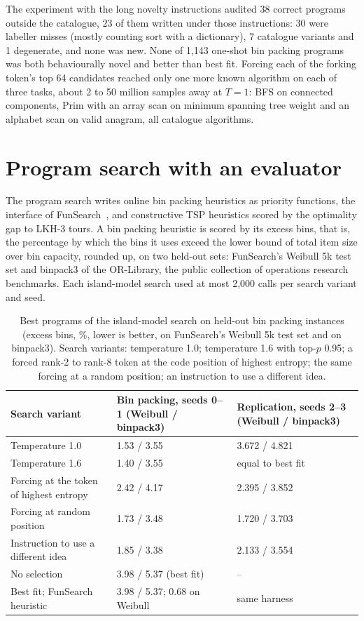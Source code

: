 \documentclass[11pt,letterpaper]{article}
\begin{document}
The experiment with the long novelty instructions audited 38 correct programs outside the catalogue, 23 of them written under those instructions: 30 were labeller misses (mostly counting sort with a dictionary), 7 catalogue variants and 1 degenerate, and none was new. None of 1,143 one-shot bin packing programs was both behaviourally novel and better than best fit. Forcing each of the forking token's top 64 candidates reached only one more known algorithm on each of three tasks, about 2 to 50 million samples away at $T = 1$: BFS on connected components, Prim with an array scan on minimum spanning tree weight and an alphabet scan on valid anagram, all catalogue algorithms.

\section{Program search with an evaluator}
\label{app:search}

The program search writes online bin packing heuristics as priority functions, the interface of FunSearch~\citep{RomeraParedes2023}, and constructive TSP heuristics scored by the optimality gap to LKH-3 tours. A bin packing heuristic is scored by its excess bins, that is, the percentage by which the bins it uses exceed the lower bound of total item size over bin capacity, rounded up, on two held-out sets: FunSearch's Weibull 5k test set and binpack3 of the OR-Library, the public collection of operations research benchmarks. Each island-model search used at most 2,000 calls per search variant and seed.

\begin{table}[!htbp]
\centering
\footnotesize
\caption{Best programs of the island-model search on held-out bin packing instances (excess bins, \%, lower is better, on FunSearch's Weibull 5k test set and on binpack3). Search variants: temperature 1.0; temperature 1.6 with top-$p$ 0.95; a forced rank-2 to rank-8 token at the code position of highest entropy; the same forcing at a random position; an instruction to use a different idea.}
\label{tab:search}
\begin{tabularx}{\linewidth}{@{}YL{4.6cm}L{4.4cm}@{}}
\toprule
Search variant & Bin packing, seeds 0--1 (Weibull / binpack3) & Replication, seeds 2--3 (Weibull / binpack3) \\
\midrule
Temperature 1.0 & 1.53 / 3.55 & 3.672 / 4.821 \\
Temperature 1.6 & 1.40 / 3.55 & equal to best fit \\
Forcing at the token of highest entropy & 2.42 / 4.17 & 2.395 / 3.852 \\
Forcing at random position & 1.73 / 3.48 & 1.720 / 3.703 \\
Instruction to use a different idea & 1.85 / 3.38 & 2.133 / 3.554 \\
No selection & 3.98 / 5.37 (best fit) & -- \\
Best fit; FunSearch heuristic & 3.98 / 5.37; 0.68 on Weibull & same harness \\
\bottomrule
\end{tabularx}
\end{table}
\end{document}
